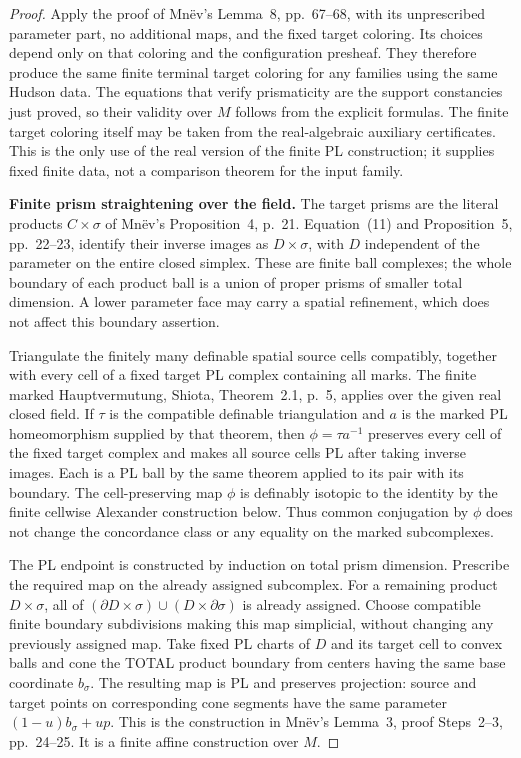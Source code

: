 \documentclass[11pt,a4paper]{article}
\theoremstyle{definition}
\begin{document}
\begin{proof}
Apply the proof of Mn\"ev's Lemma~8, pp.~67--68, with its
unprescribed parameter part, no additional maps, and the
fixed target coloring. Its choices depend only on that coloring
and the configuration presheaf. They therefore produce the
same finite terminal target coloring for any families using
the same Hudson data. The equations that verify prismaticity
are the support constancies just proved, so their validity
over $M$ follows from the explicit formulas. The finite target
coloring itself may be taken from the real-algebraic auxiliary
certificates. This is the only use of the real version of the
finite PL construction; it supplies fixed finite data, not a
comparison theorem for the input family.

\textbf{Finite prism straightening over the field.}\quad
The target prisms are the literal products $C\times\sigma$
of Mn\"ev's Proposition~4, p.~21. Equation~(11) and
Proposition~5, pp.~22--23, identify their inverse images as
$D\times\sigma$, with $D$ independent of the parameter on
the entire closed simplex. These are finite ball complexes;
the whole boundary of each product ball is a union of proper
prisms of smaller total dimension. A lower parameter face
may carry a spatial refinement, which does not affect this
boundary assertion.

Triangulate the finitely many definable spatial source cells
compatibly, together with every cell of a fixed target PL
complex containing all marks. The finite marked
Hauptvermutung, Shiota, Theorem~2.1, p.~5, applies over the
given real closed field. If $\tau$ is the compatible definable
triangulation and $a$ is the marked PL homeomorphism supplied
by that theorem, then $\phi=\tau a^{-1}$ preserves every
cell of the fixed target complex and makes all source cells
PL after taking inverse images. Each is a PL ball by the
same theorem applied to its pair with its boundary.
The cell-preserving map $\phi$ is definably isotopic to the
identity by the finite cellwise Alexander construction below.
Thus common conjugation by $\phi$ does not change the
concordance class or any equality on the marked subcomplexes.

The PL endpoint is constructed by induction on total prism
dimension. Prescribe the required map on the already assigned
subcomplex. For a remaining product $D\times\sigma$, all of
$(\partial D\times\sigma)\cup(D\times\partial\sigma)$ is
already assigned. Choose compatible finite boundary
subdivisions making this map simplicial, without changing
any previously assigned map. Take fixed PL charts of $D$
and its target cell to convex balls and cone the TOTAL
product boundary from centers having the same base coordinate
$b_\sigma$. The resulting map is PL and preserves projection:
source and target points on corresponding cone segments have
the same parameter $(1-u)b_\sigma+up$. This is the construction
in Mn\"ev's Lemma~3, proof Steps~2--3, pp.~24--25.
It is a finite affine construction over $M$.


\end{proof}
\end{document}
